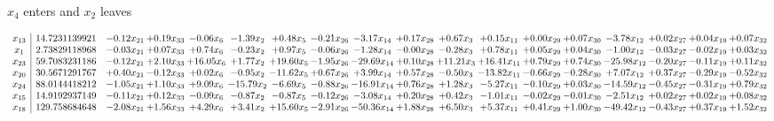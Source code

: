 \documentclass[9pt]{article}
\begin{document}
 $ x_{4} $ enters and $ x_{2} $ leaves 

 \[\begin{array}{c| c c@{\hskip 2pt} c@{\hskip 2pt} c@{\hskip 2pt} c@{\hskip 2pt} c@{\hskip 2pt} c@{\hskip 2pt} c@{\hskip 2pt} c@{\hskip 2pt} c@{\hskip 2pt} c@{\hskip 2pt} c@{\hskip 2pt} c@{\hskip 2pt} c@{\hskip 2pt} c@{\hskip 2pt} c@{\hskip 2pt} c@{\hskip 2pt} }
 x_{13}   &  14.7231139921 & -0.12 x_{21} & +  0.19 x_{33} & -0.06 x_{6} & -1.39 x_{2} & +  0.48 x_{5} & -0.21 x_{26} & -3.17 x_{14} & +  0.17 x_{28} & +  0.67 x_{3} & +  0.15 x_{11} & +  0.00 x_{29} & +  0.07 x_{30} & -3.78 x_{12} & +  0.02 x_{27} & +  0.04 x_{19} & +  0.07 x_{32}\\
 x_{1}   &  2.73829118968 & -0.03 x_{21} & +  0.07 x_{33} & +  0.74 x_{6} & -0.23 x_{2} & +  0.97 x_{5} & -0.06 x_{26} & -1.28 x_{14} & -0.00 x_{28} & -0.28 x_{3} & +  0.78 x_{11} & +  0.05 x_{29} & +  0.04 x_{30} & -1.00 x_{12} & -0.03 x_{27} & -0.02 x_{19} & +  0.03 x_{32}\\
 x_{23}   &  59.7083231186 & -0.12 x_{21} & +  2.10 x_{33} & + 16.05 x_{6} & +  1.77 x_{2} & + 19.60 x_{5} & -1.95 x_{26} & -29.69 x_{14} & +  0.10 x_{28} & + 11.21 x_{3} & + 16.41 x_{11} & +  0.79 x_{29} & +  0.74 x_{30} & -25.98 x_{12} & -0.20 x_{27} & -0.11 x_{19} & +  0.11 x_{32}\\
 x_{20}   &  30.5671291767 & +  0.40 x_{21} & -0.12 x_{33} & +  0.02 x_{6} & -0.95 x_{2} & -11.62 x_{5} & +  0.67 x_{26} & +  3.99 x_{14} & +  0.57 x_{28} & -0.50 x_{3} & -13.82 x_{11} & -0.66 x_{29} & -0.28 x_{30} & +  7.07 x_{12} & +  0.37 x_{27} & -0.29 x_{19} & -0.52 x_{32}\\
 x_{24}   &  88.0144418212 & -1.05 x_{21} & +  1.10 x_{33} & +  9.09 x_{6} & -15.79 x_{2} & -6.69 x_{5} & -0.88 x_{26} & -16.91 x_{14} & +  0.76 x_{28} & +  1.28 x_{3} & -5.27 x_{11} & -0.10 x_{29} & +  0.03 x_{30} & -14.59 x_{12} & -0.45 x_{27} & -0.31 x_{19} & +  0.79 x_{32}\\
 x_{15}   &  14.9192937149 & -0.11 x_{21} & +  0.12 x_{33} & -0.09 x_{6} & -0.87 x_{2} & -0.87 x_{5} & -0.12 x_{26} & -3.08 x_{14} & +  0.20 x_{28} & +  0.42 x_{3} & -1.01 x_{11} & -0.02 x_{29} & -0.01 x_{30} & -2.51 x_{12} & +  0.02 x_{27} & +  0.02 x_{19} & +  0.08 x_{32}\\
 x_{18}   &  129.758684648 & -2.08 x_{21} & +  1.56 x_{33} & +  4.29 x_{6} & +  3.41 x_{2} & + 15.60 x_{5} & -2.91 x_{26} & -50.36 x_{14} & +  1.88 x_{28} & +  6.50 x_{3} & +  5.37 x_{11} & +  0.41 x_{29} & +  1.00 x_{30} & -49.42 x_{12} & -0.43 x_{27} & +  0.37 x_{19} & +  1.52 x_{32}\\

\end{array}\]
\end{document}
